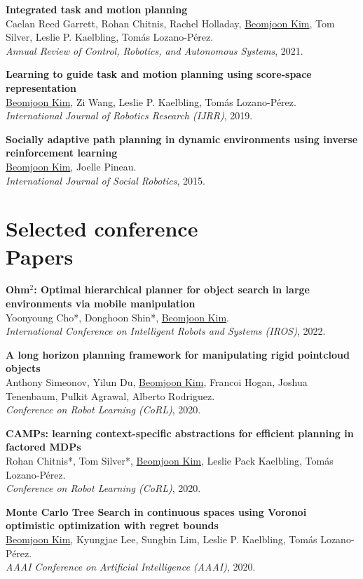 \documentclass[line,margin,letterpaper]{res}
\begin{document}
\begin{resume}
\textbf{Integrated task and motion planning}\\
Caelan Reed Garrett, Rohan Chitnis, Rachel Holladay, \underline{Beomjoon Kim}, Tom Silver, Leslie P. Kaelbling, Tom\'as Lozano-P\'erez.\\
{\sl Annual Review of Control, Robotics, and Autonomous Systems}, 2021.

\textbf{Learning to guide task and motion planning using score-space representation}\\
\underline{Beomjoon Kim}, Zi Wang, Leslie P. Kaelbling, Tom\'as Lozano-P\'erez.\\
{\sl International Journal of Robotics Research (IJRR)}, 2019.

\textbf{Socially adaptive path planning in dynamic environments using inverse reinforcement learning}\\
\underline{Beomjoon Kim}, Joelle Pineau.\\
{\sl International Journal of Social Robotics}, 2015.

\section{Selected conference \\Papers}
\textbf{Ohm$^2$: Optimal hierarchical planner for object search in large environments via mobile manipulation}\\
Yoonyoung Cho*, Donghoon Shin*, \underline{Beomjoon Kim}. \\
{\sl International Conference on Intelligent Robots and Systems (IROS)}, 2022.

\textbf{A long horizon planning framework for manipulating rigid pointcloud objects}\\
Anthony Simeonov, Yilun Du, \underline{Beomjoon Kim}, Francoi Hogan, Joshua Tenenbaum, Pulkit Agrawal, Alberto Rodriguez.\\
{\sl Conference on Robot Learning (CoRL)}, 2020.

\textbf{CAMPs: learning context-specific abstractions for efficient planning in factored MDPs}\\
Rohan Chitnis*, Tom Silver*, \underline{Beomjoon Kim}, Leslie Pack Kaelbling, Tom\'as Lozano-P\'erez.\\
{\sl Conference on Robot Learning (CoRL)}, 2020.

\textbf{Monte Carlo Tree Search in continuous spaces using Voronoi optimistic optimization with regret bounds}\\
\underline{Beomjoon Kim}, Kyungjae Lee, Sungbin Lim, Leslie P. Kaelbling, Tom\'as Lozano-P\'erez.\\
{\sl AAAI Conference on Artificial Intelligence (AAAI)}, 2020.


\end{resume}
\end{document}
